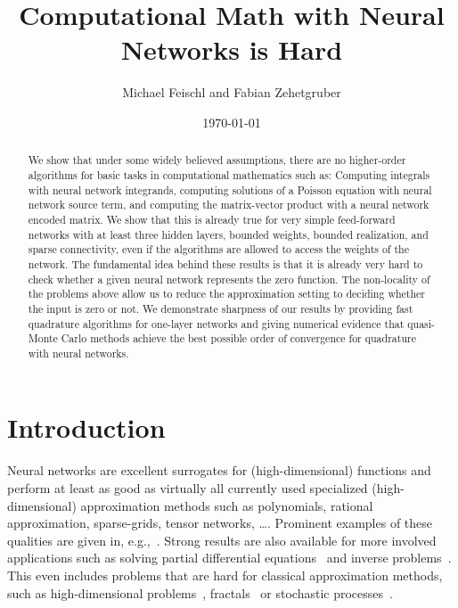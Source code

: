 \documentclass{amsart}[11pt]
\title{Computational Math with Neural Networks is Hard}
\author{Michael Feischl and Fabian Zehetgruber}
\date{\today}
\numberwithin{equation}{section}
\numberwithin{theorem}{section}
\begin{document}
 

 

\begin{abstract}
We show that under some  widely believed assumptions, there are no higher-order algorithms for basic tasks in computational mathematics such as: Computing integrals with  neural network integrands, computing solutions of a Poisson equation with neural network source term, and computing the matrix-vector product with a neural network encoded matrix.
We show that this is already true for very simple feed-forward networks with at least three hidden layers, bounded weights, bounded realization, and sparse connectivity, even if the algorithms are allowed to access the weights of the network. The fundamental idea behind these results is that it is already very hard to check whether a given neural network represents the zero function. The non-locality of the problems above allow us to reduce the approximation setting to deciding whether the input is zero or not. We demonstrate sharpness of our results by providing fast quadrature algorithms for one-layer networks and giving numerical evidence that quasi-Monte Carlo methods achieve the best possible order of convergence for quadrature with neural networks.
\end{abstract}

\maketitle 

\section{Introduction}
\noindent
Neural networks are excellent surrogates for (high-dimensional) functions and perform at least as good as virtually all currently used
specialized (high-dimensional) approximation methods such as polynomials, rational approximation, sparse-grids, tensor networks, \ldots.
Prominent examples of these qualities are given in, e.g.,~\cite{jentzen_approx,schwab_approx,schwab_approx2,schwab_approx3}. Strong results are also available for more involved applications such as solving partial differential equations~\cite{deep_ritz0,deep_ritz1,ZANG2020109409} and inverse problems~\cite{schwab_inverse,berg_inverse}. This even includes problems that are hard for classical approximation methods, such as high-dimensional problems~\cite{schwab_approx2}, fractals~\cite{fractals} or stochastic processes~\cite{jentzen_approx}.
 
\end{document}
